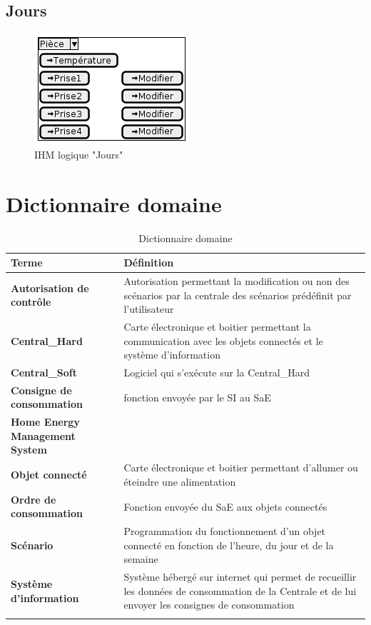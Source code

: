 \documentclass[10pt,a4paper]{report}
\renewcommand{\arraystretch}{1.2}
\begin{document}
		\section{Jours}

\begin{figure}[H]
	\centering
	\includegraphics[scale=0.55]{Jours}
	\caption{IHM logique "Jours"}
	\label{ihmLogiqueJours}
\end{figure}

	\chapter{Dictionnaire domaine}
	
{
\renewcommand{\arraystretch}{1.2}		
\begin{longtable}{| l | p{11cm} |}
	\hline
	\textbf{Terme} & Définition\tabularnewline
	\hline
	\textbf{Autorisation de contrôle} & Autorisation permettant la modification ou non des scénarios par la centrale des scénarios prédéfinit par l'utilisateur\tabularnewline
	\hline
	\textbf{Central\_Hard} & Carte électronique et boitier permettant la communication avec les objets connectés et le système d'information\tabularnewline
	\hline
	\textbf{Central\_Soft} & Logiciel qui s'exécute sur la Central\_Hard \tabularnewline
	\hline
	\textbf{Consigne de consommation} & fonction envoyée par le SI au SaE\tabularnewline
	\hline
	\textbf{Home Energy Management System} &  \tabularnewline%
	\hline
	\textbf{Objet connecté} & Carte électronique et boitier permettant d'allumer ou éteindre une alimentation \tabularnewline %
	\hline
	\textbf{Ordre de consommation} & Fonction envoyée du SaE aux objets connectés\tabularnewline
	\hline
	\textbf{Scénario} & Programmation du fonctionnement d'un objet connecté en fonction de l'heure, du jour et de la semaine\tabularnewline
	\hline
	\textbf{Système d'information} & Système hébergé sur internet qui permet de recueillir les données de consommation de la Centrale et de lui envoyer les consignes de consommation\tabularnewline
	\hline
\caption{Dictionnaire domaine}
\label{dicoDomaine}
\end{longtable}
}


	

\tableofcontents
\listoffigures
\listoftables
\end{document}
